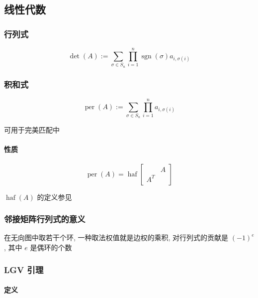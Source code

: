 \subsection{线性代数}

\subsubsection{行列式}

\begin{equation}
    \operatorname{det}(A):=\sum_{\sigma\in S_n}\prod_{i=1}^n \operatorname{sgn}(\sigma) a_{i,\sigma(i)}
\end{equation}

\subsubsection{积和式}

\begin{equation}
    \operatorname{per}(A):=\sum_{\sigma\in S_n}\prod_{i=1}^n a_{i,\sigma(i)}
\end{equation}

可用于完美匹配中

\paragraph{性质}

\begin{equation}
    \operatorname{per}(A)=\operatorname{haf}\begin{bmatrix}
            & A \\
        A^T & 
    \end{bmatrix}
\end{equation}

\(\operatorname{haf}(A)\) 的定义参见 

\subsubsection{邻接矩阵行列式的意义}

在无向图中取若干个环, 一种取法权值就是边权的乘积, 对行列式的贡献是 \((-1)^{e}\), 其中 \(e\) 是偶环的个数


\subsubsection{LGV 引理}

\paragraph{定义}

